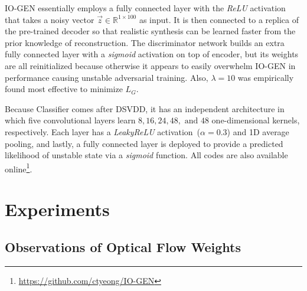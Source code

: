 \documentclass[letterpaper]{article} %
\begin{document}
\mbox{IO-GEN} essentially employs a fully connected layer with the \emph{ReLU}
activation that takes a noisy vector $\vec{z} \in \mathbb{R}^{1 \times
100}$ as input. It is then connected to a replica of the pre-trained decoder
so that realistic synthesis can be learned faster from the prior
knowledge of reconstruction. The discriminator network builds an extra
fully connected layer with a \emph{sigmoid} activation on top of
encoder, but its weights are all reinitialized because otherwise it
appears to easily overwhelm \mbox{IO-GEN} in performance causing unstable
adversarial training. Also, $\lambda=10$ was empirically found most
effective to minimize $\mathit{L_G}$.

Because Classifier comes after DSVDD, it has an independent architecture
in which five convolutional layers learn $8, 16, 24, 48, \text{ and }
48$ one-dimensional kernels, respectively. Each layer has a
\emph{LeakyReLU} activation~($\alpha=0.3$) and 1D average pooling, and
lastly, a fully connected layer is deployed to provide a predicted
likelihood of unstable state via a \emph{sigmoid} function.
All codes are also available
online\footnote{\url{https://github.com/ctyeong/IO-GEN}}.

\section{Experiments}
\label{sec:experiments}


\subsection{Observations of Optical Flow Weights}
\label{sec:obs_optical_flow_weights}
\end{document}

